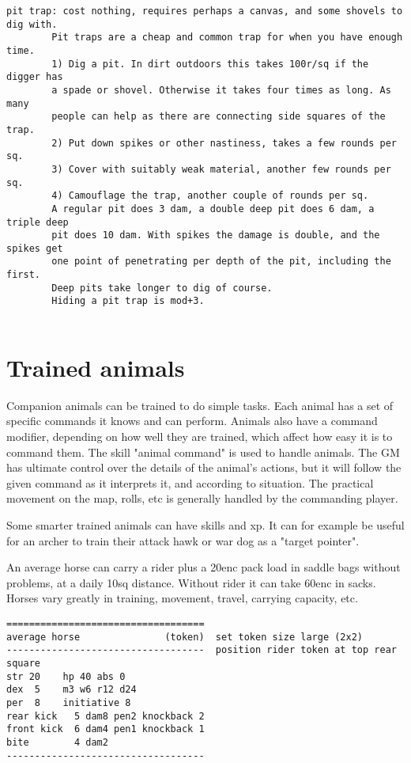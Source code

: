 \begin{verbatim}
pit trap: cost nothing, requires perhaps a canvas, and some shovels to dig with.
        Pit traps are a cheap and common trap for when you have enough time.
        1) Dig a pit. In dirt outdoors this takes 100r/sq if the digger has
        a spade or shovel. Otherwise it takes four times as long. As many
        people can help as there are connecting side squares of the trap.
        2) Put down spikes or other nastiness, takes a few rounds per sq.
        3) Cover with suitably weak material, another few rounds per sq.
        4) Camouflage the trap, another couple of rounds per sq.
        A regular pit does 3 dam, a double deep pit does 6 dam, a triple deep
        pit does 10 dam. With spikes the damage is double, and the spikes get
        one point of penetrating per depth of the pit, including the first.
        Deep pits take longer to dig of course.
        Hiding a pit trap is mod+3.


\end{verbatim} \normalsize





\section*{Trained animals}

Companion animals can be trained to do simple tasks. Each animal has a set of specific commands it knows and can perform. Animals also have a command modifier, depending on how well they are trained, which affect how easy it is to command them. The skill "animal command" is used to handle animals.
The GM has ultimate control over the details of the animal's actions, but it will follow the given command as it interprets it, and according to situation. The practical movement on the map, rolls, etc is generally handled by the commanding player.

Some smarter trained animals can have skills and xp.
It can for example be useful for an archer to train their attack hawk or war dog as a "target pointer".



\openitemslist

An average horse can carry a rider plus a 20enc pack load in saddle bags without problems, at a daily 10sq distance. Without rider it can take 60enc in sacks. Horses vary greatly in training, movement, travel, carrying capacity, etc.
\small \begin{samepage} \begin{verbatim}
===================================
average horse               (token)  set token size large (2x2)
-----------------------------------  position rider token at top rear square
str 20    hp 40 abs 0
dex  5    m3 w6 r12 d24
per  8    initiative 8
rear kick   5 dam8 pen2 knockback 2
front kick  6 dam4 pen1 knockback 1
bite        4 dam2
-----------------------------------
\end{verbatim} \end{samepage} \normalsize


